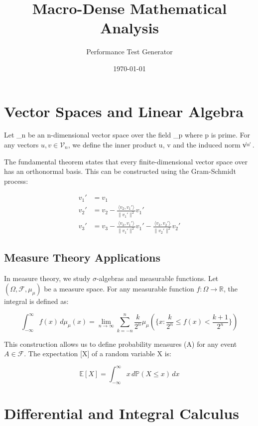\documentclass{article}
\newcommand{\vectorspace}[1]{\mathcal{V}_{#1}}
\newcommand{\innerproduct}[2]{\langle #1, #2 \rangle}
\newcommand{\norm}[1]{\|#1\|}
\newcommand{\real}{\mathbb{R}}
\newcommand{\field}[1]{\mathbb{F}_{#1}}
\newcommand{\measure}[1]{\mu_{#1}}
\newcommand{\probability}[1]{\mathbb{P}(#1)}
\newcommand{\expectation}[1]{\mathbb{E}[#1]}
\newcommand{\integral}[4]{\int_{#1}^{#2} #3 \, d#4}
\newcommand{\limit}[3]{\lim_{#1 \to #2} #3}
\newcommand{\series}[3]{\sum_{#1}^{#2} #3}
\begin{document}
\title{Macro-Dense Mathematical Analysis}
\author{Performance Test Generator}
\date{\today}
\maketitle

\section{Vector Spaces and Linear Algebra}

Let \vectorspace{n} be an n-dimensional vector space over the field \field{p} where p is prime. For any vectors \(u, v \in \vectorspace{n}\), we define the inner product \innerproduct{u}{v} and the induced norm \norm{v} = \sqrt{\innerproduct{v}{v}}.

The fundamental theorem states that every finite-dimensional vector space over \real{} has an orthonormal basis. This can be constructed using the Gram-Schmidt process:

\begin{align}
v_1' &= v_1 \\
v_2' &= v_2 - \frac{\innerproduct{v_2}{v_1'}}{\norm{v_1'}^2} v_1' \\
v_3' &= v_3 - \frac{\innerproduct{v_3}{v_1'}}{\norm{v_1'}^2} v_1' - \frac{\innerproduct{v_3}{v_2'}}{\norm{v_2'}^2} v_2'
\end{align}

\subsection{Measure Theory Applications}

In measure theory, we study \(\sigma\)-algebras and measurable functions. Let \((\Omega, \mathcal{F}, \measure{\mu})\) be a measure space. For any measurable function \(f: \Omega \to \real{}\), the integral is defined as:

\[\integral{-\infty}{\infty}{f(x)}{\measure{\mu}(x)} = \limit{n}{\infty}{\series{k=-n}{n}{\frac{k}{2^n} \measure{\mu}(\{x: \frac{k}{2^n} \leq f(x) < \frac{k+1}{2^n}\})}}\]

This construction allows us to define probability measures \probability{A} for any event \(A \in \mathcal{F}\). The expectation \expectation{X} of a random variable X is:

\[\expectation{X} = \integral{-\infty}{\infty}{x \, d\probability{X \leq x}}{x}\]

\section{Differential and Integral Calculus}
\end{document}
